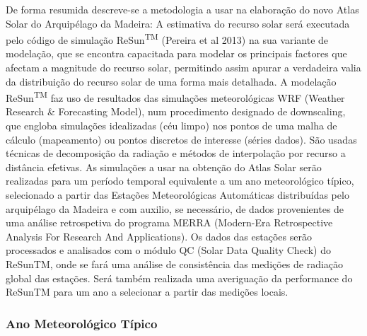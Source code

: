 \documentclass[]{article}
\begin{document}
De forma resumida descreve-se a metodologia a usar na elaboração do novo
Atlas Solar do Arquipélago da Madeira: A estimativa do recurso solar
será executada pelo código de simulação ReSun\textsuperscript{TM}
(Pereira et al 2013) na sua variante de modelação, que se encontra
capacitada para modelar os principais factores que afectam a magnitude
do recurso solar, permitindo assim apurar a verdadeira valia da
distribuição do recurso solar de uma forma mais detalhada. A modelação
ReSun\textsuperscript{TM} faz uso de resultados das simulações
meteorológicas WRF (Weather Research \& Forecasting Model), num
procedimento designado de downscaling, que engloba simulações
idealizadas (céu limpo) nos pontos de uma malha de cálculo (mapeamento)
ou pontos discretos de interesse (séries dados). São usadas técnicas de
decomposição da radiação e métodos de interpolação por recurso a
distância efetivas. As simulações a usar na obtenção do Atlas Solar
serão realizadas para um período temporal equivalente a um ano
meteorológico típico, selecionado a partir das Estações Meteorológicas
Automáticas distribuídas pelo arquipélago da Madeira e com auxilio, se
necessário, de dados provenientes de uma análise retrospetiva do
programa MERRA (Modern-Era Retrospective Analysis For Research And
Applications). Os dados das estações serão processados e analisados com
o módulo QC (Solar Data Quality Check) do ReSunTM, onde se fará uma
análise de consistência das medições de radiação global das estações.
Será também realizada uma averiguação da performance do ReSunTM para um
ano a selecionar a partir das medições locais.

\subsubsection{Ano Meteorológico Típico}\label{ano-meteorologico-tipico}
\end{document}
